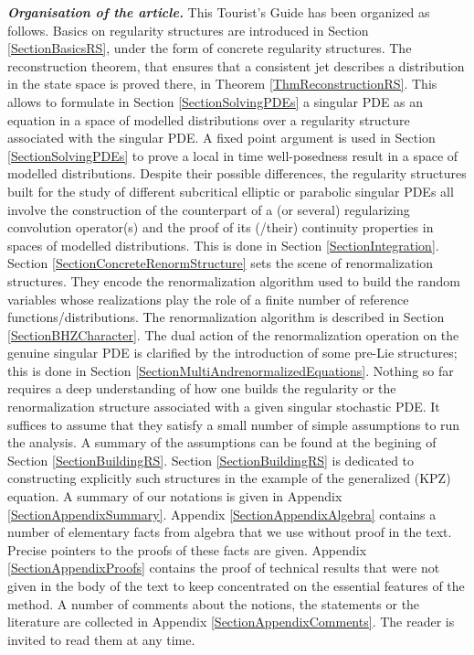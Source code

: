\documentclass[10pt, reqno]{amsart}
\numberwithin{subsection}{section}
\numberwithin{subsubsection}{subsection}
\numberwithin{equation}{section} %
\theoremstyle{mystyle}
\theoremstyle{mystyle2}
\theoremstyle{mystyle3}
\begin{document}
\textit{\textbf{Organisation of the article.}} This Tourist's Guide has been organized as follows. Basics on regularity structures are introduced in Section \ref{SectionBasicsRS}, under the form of concrete regularity structures. The reconstruction theorem, that ensures that a consistent jet describes a distribution in the state space is proved there, in Theorem \ref{ThmReconstructionRS}. This allows to formulate in Section \ref{SectionSolvingPDEs} a singular PDE as an equation in a space of modelled distributions over a regularity structure associated with the singular PDE. A fixed point argument is used in Section \ref{SectionSolvingPDEs} to prove a local in time well-posedness result in a space of modelled distributions. Despite their possible differences, the regularity structures built for the study of different subcritical elliptic or parabolic 
singular PDEs all involve the construction of the counterpart of a (or several) regularizing convolution operator(s) and the proof of its (/their) 
continuity properties in spaces of modelled distributions. This is done in Section \ref{SectionIntegration}. Section \ref{SectionConcreteRenormStructure} sets the scene of renormalization structures. They encode the renormalization algorithm used to build the random variables whose realizations play the role of a finite number of reference functions/distributions. The renormalization algorithm is described in Section \ref{SectionBHZCharacter}. The dual action of the renormalization operation on the genuine singular PDE is clarified by the introduction of some pre-Lie structures; this is done in Section \ref{SectionMultiAndrenormalizedEquations}. Nothing so far requires a deep understanding of how one builds the regularity or the renormalization structure associated with a given singular stochastic PDE. It suffices to assume that they satisfy a small number of simple assumptions to run the analysis. A summary of the assumptions can be found at the begining of Section \ref{SectionBuildingRS}. Section \ref{SectionBuildingRS} is dedicated to constructing explicitly such structures in the example of the generalized (KPZ) equation. A summary of our notations is given in Appendix {\sf \ref{SectionAppendixSummary}}. Appendix {\sf \ref{SectionAppendixAlgebra}} contains a number of elementary facts from algebra that we use without proof in the text. Precise pointers to the proofs of these facts are given. Appendix {\sf \ref{SectionAppendixProofs}} contains the proof of technical results that were not given in the body of the text to keep concentrated on the essential features of the method. A number of comments about the notions, the statements or the literature are collected in Appendix {\sf \ref{SectionAppendixComments}}. The reader is invited to read them at any time.
\end{document}
